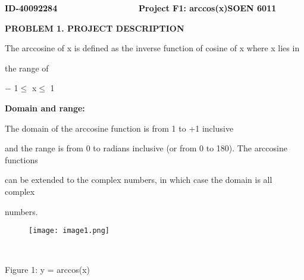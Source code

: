 \documentclass[12pt]{article}
\begin{document}
\textbf{\textcolor[HTML]{0D0D0D}{ID-40092284\ \ \ \ \ \ \ \ \ \ \ \ \ \ \ \ \  Project F1: arccos(x)\tab \tab \tab SOEN 6011}}\par



\textbf{PROBLEM 1. PROJECT DESCRIPTION}\par

The arccosine of x is defined as the inverse function of cosine of x where x lies in\par

the range of\par

$-$ 1$ \leq $ x$ \leq $ 1\par

\textbf{Domain and range:}\par

The domain of the arccosine function is from 1 to +1 inclusive\par

and the range is from 0 to radians inclusive (or from 0 to 180). The arccosine functions\par

can be extended to the complex numbers, in which case the domain is all complex\par

numbers.\par




\begin{figure}[H]
	\begin{Center}
		\texttt{[image: image1.png]}
	\end{Center}
\end{figure}



\ \ \ \ \ \ \ \ \ \ \ \ \ \ \ \ \ \ \ \ \ \ \ \ \ \ \ \ \ \ \ \ \ \ \ \ \ \ \ \ \ \ \ \ \ \ \  \par

\begin{adjustwidth}{2.0in}{0.0in}
Figure 1: y = arccos(x)\par

\end{adjustwidth}


\vspace{\baselineskip}
\end{document}

